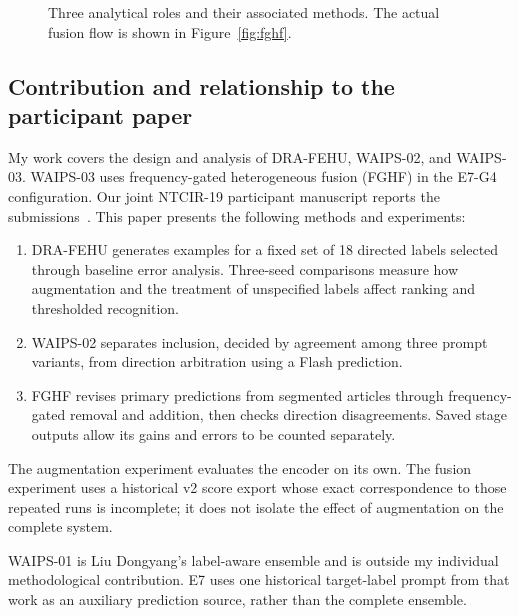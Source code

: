 \documentclass[12pt,a4paper]{article}
\begin{document}
\begin{figure}[htbp]
\centering
{}
\caption{Three analytical roles and their associated methods. The actual fusion flow is shown in Figure~\ref{fig:fghf}.}
\label{fig:decisions}
\end{figure}

\subsection{Contribution and relationship to the participant paper}
My work covers the design and analysis of DRA-FEHU, WAIPS-02, and WAIPS-03. WAIPS-03 uses frequency-gated heterogeneous fusion (FGHF) in the E7-G4 configuration. Our joint NTCIR-19 participant manuscript reports the submissions~\cite{waipspaper}. This paper presents the following methods and experiments:
\begin{enumerate}
\item DRA-FEHU generates examples for a fixed set of 18 directed labels selected through baseline error analysis. Three-seed comparisons measure how augmentation and the treatment of unspecified labels affect ranking and thresholded recognition.
\item WAIPS-02 separates inclusion, decided by agreement among three prompt variants, from direction arbitration using a Flash prediction.
\item FGHF revises primary predictions from segmented articles through frequency-gated removal and addition, then checks direction disagreements. Saved stage outputs allow its gains and errors to be counted separately.
\end{enumerate}
The augmentation experiment evaluates the encoder on its own. The fusion experiment uses a historical v2 score export whose exact correspondence to those repeated runs is incomplete; it does not isolate the effect of augmentation on the complete system.

WAIPS-01 is Liu Dongyang's label-aware ensemble and is outside my individual methodological contribution. E7 uses one historical target-label prompt from that work as an auxiliary prediction source, rather than the complete ensemble.
\end{document}
